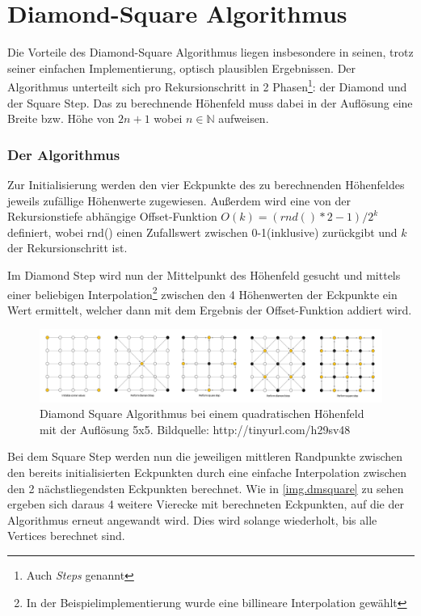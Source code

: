\chapter{Diamond-Square Algorithmus}\label{diamondsquare}
Die Vorteile des Diamond-Square Algorithmus liegen insbesondere in seinen, trotz seiner einfachen Implementierung, optisch plausiblen Ergebnissen. 
Der Algorithmus unterteilt sich pro Rekursionschritt in 2 Phasen\footnote{Auch \emph{Steps} genannt}: der Diamond und der Square Step. Das zu berechnende Höhenfeld muss dabei in der Auflösung eine Breite bzw. Höhe von $2n+1$ wobei $ n\in\mathbb{N}$ aufweisen.

\subsection{Der Algorithmus}
Zur Initialisierung werden den vier Eckpunkte des zu berechnenden Höhenfeldes jeweils zufällige Höhenwerte zugewiesen. Außerdem wird eine von der Rekursionstiefe abhängige Offset-Funktion $O(k)=(rnd()*2-1)/2^k$ definiert, wobei rnd() einen Zufallswert zwischen 0-1(inklusive) zurückgibt und $k$ der Rekursionschritt ist.

Im Diamond Step wird nun der Mittelpunkt des Höhenfeld gesucht und mittels einer beliebigen Interpolation\footnote{In der Beispielimplementierung wurde eine billineare Interpolation gewählt} zwischen den 4 Höhenwerten der Eckpunkte ein Wert ermittelt, welcher dann mit dem Ergebnis der Offset-Funktion addiert wird.
\begin{figure}
	\centering
	\includegraphics[width=\textwidth]{images/Diamond_Square.png}
	\caption{Diamond Square Algorithmus bei einem quadratischen Höhenfeld mit der Auflösung 5x5. Bildquelle: http://tinyurl.com/h29sv48}\label{img.dmsquare}
\end{figure}
Bei dem Square Step werden nun die jeweiligen mittleren Randpunkte zwischen den bereits initialisierten Eckpunkten durch eine einfache Interpolation zwischen den 2 nächstliegendsten Eckpunkten berechnet.
Wie in \autoref{img.dmsquare} zu sehen ergeben sich daraus 4 weitere Vierecke mit berechneten Eckpunkten, auf die der Algorithmus erneut angewandt wird. Dies wird solange wiederholt, bis alle Vertices berechnet sind.


